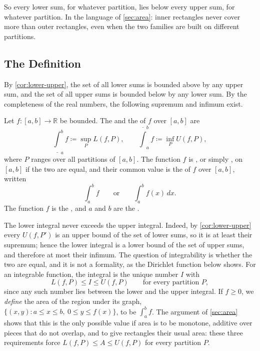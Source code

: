 So every lower sum, for whatever partition, lies below every upper sum, for whatever partition. In the language of \cref{sec:area}: inner rectangles never cover more than outer rectangles, even when the two families are built on different partitions.

\subsection{The Definition}

By \cref{cor:lower-upper}, the set of all lower sums is bounded above by any upper sum, and the set of all upper sums is bounded below by any lower sum. By the completeness of the real numbers, the following supremum and infimum exist.

\begin{definition}
\label{def:riemann-integral}
Let $f\colon[a,b]\to\mathbb R$ be bounded. The  and the  of $f$ over $[a,b]$ are
\[
\underline{\int}_a^bf\coloneqq\sup_PL(f,P),\qquad\overline{\int}_a^bf\coloneqq\inf_PU(f,P),
\]
where $P$ ranges over all partitions of $[a,b]$. The function $f$ is , or simply , on $[a,b]$ if the two are equal, and their common value is the  of $f$ over $[a,b]$, written
\[
\int_a^bf\qquad\text{or}\qquad\int_a^bf(x)\,dx .
\]
The function $f$ is the , and $a$ and $b$ are the .
\end{definition}

The lower integral never exceeds the upper integral. Indeed, by \cref{cor:lower-upper} every $U(f,P')$ is an upper bound of the set of lower sums, so it is at least their supremum; hence the lower integral is a lower bound of the set of upper sums, and therefore at most their infimum. The question of integrability is whether the two are equal, and it is not a formality, as the Dirichlet function below shows. For an integrable function, the integral is the unique number $I$ with
\[
L(f,P)\le I\le U(f,P)\qquad\text{for every partition }P,
\]
since any such number lies between the lower and the upper integral. If $f\ge0$, we \emph{define} the area of the region under its graph, $\{(x,y): a\le x\le b,\ 0\le y\le f(x)\}$, to be $\int_a^bf$. The argument of \cref{sec:area} shows that this is the only possible value if area is to be monotone, additive over pieces that do not overlap, and to give rectangles their usual area: these three requirements force $L(f,P)\le A\le U(f,P)$ for every partition $P$.

